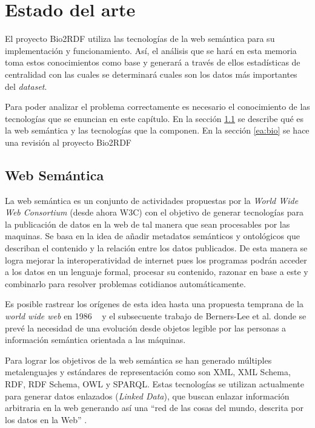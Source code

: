 
\chapter{Estado del arte}
El proyecto Bio2RDF utiliza las tecnologías de la web semántica para su
implementación y funcionamiento. Así, el análisis que se hará en esta memoria
toma estos conocimientos como base y generará a través de ellos estadísticas de
centralidad con las cuales se determinará cuales son los datos más importantes
del \emph{dataset}.

Para poder analizar el problema correctamente es necesario el conocimiento de
las tecnologías que se enuncian en este capítulo. En la sección \ref{ea:ws} se
describe qué es la web semántica y las tecnologías que la componen.
En la sección \ref{ea:bio} se hace una revisión al proyecto Bio2RDF 

\section{Web Semántica}\label{ea:ws}
La web semántica es un conjunto de actividades propuestas por la \emph{World
Wide Web Consortium} (desde ahora W3C) con el objetivo de generar tecnologías
para la publicación de datos en la web de tal manera que sean procesables por
las maquinas. 
Se basa en la idea de añadir metadatos semánticos y ontológicos que describan el
contenido y la relación entre los datos publicados. De esta manera se logra
mejorar la interoperatividad de internet pues los programas podrán acceder a los
datos en un lenguaje formal, procesar su contenido, razonar en base a este y
combinarlo para resolver problemas cotidianos automáticamente.

Es posible rastrear los orígenes de esta idea hasta una propuesta temprana de la
\emph{world wide web} en 1986 ~\cite{berners1989proposal} y el subsecuente
trabajo de Berners-Lee et al.\cite{berners1992world} donde se prevé la
necesidad de una evolución desde objetos legible por las personas a información
semántica orientada a las máquinas.

Para lograr los objetivos de la web semántica se han generado múltiples
metalenguajes y estándares de representación como son XML, XML Schema, RDF,
RDF Schema, OWL y SPARQL. Estas tecnologías se utilizan actualmente para generar
datos enlazados (\emph{Linked Data}), que buscan enlazar información arbitraria
en la web generando así una ``red de las cosas del mundo, descrita por los datos
en la Web'' \cite{berners2011linked}.

